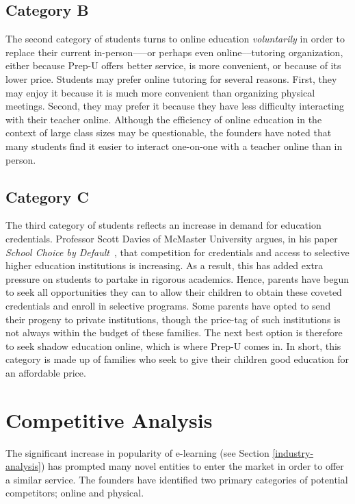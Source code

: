 \documentclass{business}
\begin{document}
    \subsection{Category B}
    The second category of students turns to online education \emph{voluntarily} in order to replace their current in-person–––or perhaps even online––tutoring organization, either because Prep-U offers better service, is more convenient, or because of its lower price. Students may prefer online tutoring for several reasons. First, they may enjoy it because it is much more convenient than organizing physical meetings. Second, they may prefer it because they have less difficulty interacting with their teacher online. Although the efficiency of online education in the context of large class sizes may be questionable, the founders have noted that many students find it easier to interact one-on-one with a teacher online than in person. 
    \subsection{Category C}
    The third category of students reflects an increase in demand for education credentials. Professor Scott Davies of McMaster University argues, in his paper \emph{School Choice by Default}~\cite{Davies}, that competition for credentials and access to selective higher education institutions is increasing. As a result, this has added extra pressure on students to partake in rigorous academics. Hence, parents have begun to seek all opportunities they can to allow their children to obtain these coveted credentials and enroll in selective programs. Some parents have opted to send their progeny to private institutions, though the price-tag of such institutions is not always within the budget of these families. The next best option is therefore to seek shadow education online, which is where Prep-U comes in. In short, this category is made up of families who seek to give their children good education for an affordable price.
    \section{Competitive Analysis}
    The significant increase in popularity of e-learning (see Section \ref{industry-analysis}) has prompted many novel entities to enter the market in order to offer a similar service. The founders have identified two primary categories of potential competitors; online and physical.
\end{document}
